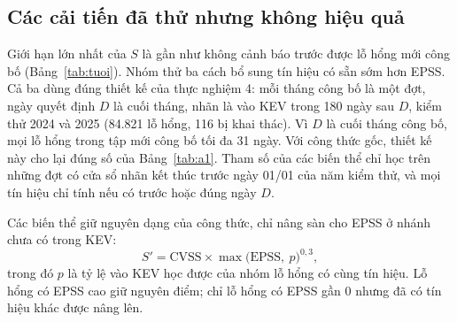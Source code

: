 
\subsection{Các cải tiến đã thử nhưng không hiệu quả}\label{sec:khonghieuqua}

Giới hạn lớn nhất của $S$ là gần như không cảnh báo trước được lỗ hổng mới công bố
(Bảng~\ref{tab:tuoi}). Nhóm thử ba cách bổ sung tín hiệu có sẵn sớm hơn EPSS. Cả ba dùng đúng
thiết kế của thực nghiệm 4: mỗi tháng công bố là một đợt, ngày quyết định $D$ là cuối tháng, nhãn
là vào KEV trong 180 ngày sau $D$, kiểm thử 2024 và 2025 (84.821 lỗ hổng, 116 bị khai thác). Vì
$D$ là cuối tháng công bố, mọi lỗ hổng trong tập mới công bố tối đa 31 ngày. Với công thức gốc,
thiết kế này cho lại đúng số của Bảng~\ref{tab:a1}. Tham số của các biến thể chỉ học trên những
đợt có cửa sổ nhãn kết thúc trước ngày 01/01 của năm kiểm thử, và mọi tín hiệu chỉ tính nếu có
trước hoặc đúng ngày $D$.

Các biến thể giữ nguyên dạng của công thức, chỉ nâng sàn cho EPSS ở nhánh chưa có trong KEV:
\begin{equation}
S' = \text{CVSS} \times \max\bigl(\text{EPSS},\ p\bigr)^{0{,}3},
\end{equation}
trong đó $p$ là tỷ lệ vào KEV học được của nhóm lỗ hổng có cùng tín hiệu. Lỗ hổng có EPSS cao
giữ nguyên điểm; chỉ lỗ hổng có EPSS gần 0 nhưng đã có tín hiệu khác được nâng lên.

